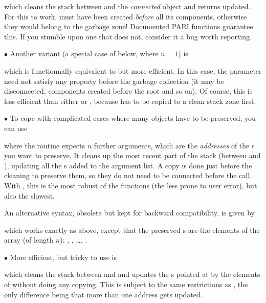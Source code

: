 \noindent which cleans the stack between  and the \emph{connected}
object  and returns  updated. For this to work,  must
have been created \emph{before} all its components, otherwise they would
belong to the garbage zone! Documented PARI functions guarantee this. If you
stumble upon one that does not, consider it a bug worth reporting.

\noindent$\bullet$ Another variant (a special case of 
below, where $n=1$) is


\noindent which is functionnally equivalent to  but more efficient. In this case, the  parameter 
need not satisfy any property before the garbage collection (it may be
disconnected, components created before the root and so on). Of course, this
is less efficient than either  or , because
 has to be copied to a clean stack zone first.

\noindent$\bullet$
To cope with complicated cases where many objects have to be
preserved, you can use


\noindent where the routine expects $n$ further arguments, which are the 
\emph{addresses} of the s you want to preserve. It cleans up the most
recent part of the stack (between  and ), updating all
the s added to the argument list. A copy is done just before the
cleaning to preserve them, so they do not need to be connected before the
call. With , this is the most robust of the 
functions (the less prone to user error), but also the slowest.

An alternative syntax, obsolete but kept for backward compatibility, is
given by


\noindent which works exactly as above, except that the preserved s
are the elements of the array  (of length $n$): ,
, \dots, .

\noindent$\bullet$ More efficient, but tricky to use is


\noindent which cleans the stack between  and  and
updates the s pointed at by the elements of  without doing
any copying. This is subject to the same restrictions as , the
only difference being that more than one address gets updated.

